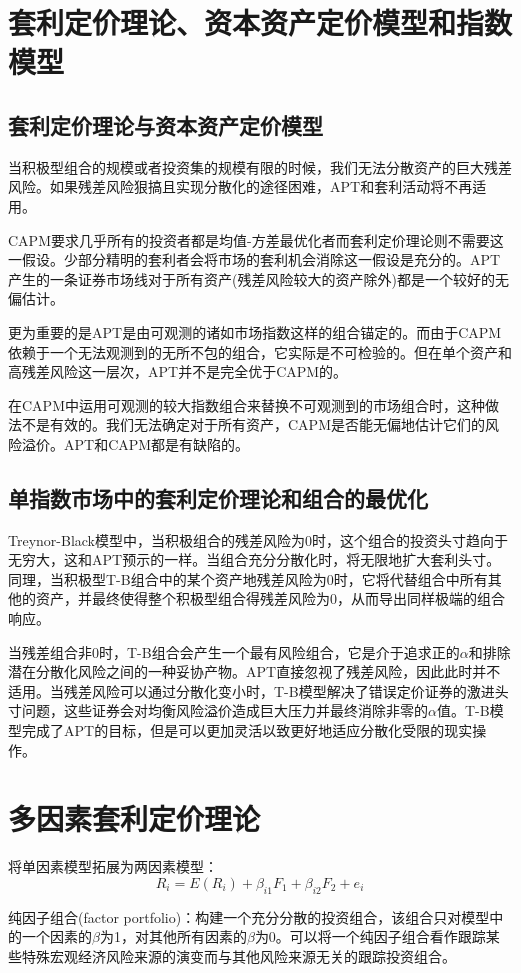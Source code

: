 \documentclass{article}
\begin{document}
\section{套利定价理论、资本资产定价模型和指数模型}
\subsection{套利定价理论与资本资产定价模型}
当积极型组合的规模或者投资集的规模有限的时候，我们无法分散资产的巨大残差风险。如果残差风险狠搞且实现分散化的途径困难，APT和套利活动将不再适用。

CAPM要求几乎所有的投资者都是均值-方差最优化者而套利定价理论则不需要这一假设。少部分精明的套利者会将市场的套利机会消除这一假设是充分的。APT产生的一条证券市场线对于所有资产(残差风险较大的资产除外)都是一个较好的无偏估计。

更为重要的是APT是由可观测的诸如市场指数这样的组合锚定的。而由于CAPM依赖于一个无法观测到的无所不包的组合，它实际是不可检验的。但在单个资产和高残差风险这一层次，APT并不是完全优于CAPM的。

在CAPM中运用可观测的较大指数组合来替换不可观测到的市场组合时，这种做法不是有效的。我们无法确定对于所有资产，CAPM是否能无偏地估计它们的风险溢价。APT和CAPM都是有缺陷的。

\subsection{单指数市场中的套利定价理论和组合的最优化}
Treynor-Black模型中，当积极组合的残差风险为0时，这个组合的投资头寸趋向于无穷大，这和APT预示的一样。当组合充分分散化时，将无限地扩大套利头寸。同理，当积极型T-B组合中的某个资产地残差风险为0时，它将代替组合中所有其他的资产，并最终使得整个积极型组合得残差风险为0，从而导出同样极端的组合响应。

当残差组合非0时，T-B组合会产生一个最有风险组合，它是介于追求正的$\alpha$和排除潜在分散化风险之间的一种妥协产物。APT直接忽视了残差风险，因此此时并不适用。当残差风险可以通过分散化变小时，T-B模型解决了错误定价证券的激进头寸问题，这些证券会对均衡风险溢价造成巨大压力并最终消除非零的$\alpha$值。T-B模型完成了APT的目标，但是可以更加灵活以致更好地适应分散化受限的现实操作。

\section{多因素套利定价理论}
将单因素模型拓展为两因素模型：
\[
R_i=E(R_i)+\beta_{i1}F_1+\beta_{i2}F_2+e_i
\]

纯因子组合(factor portfolio)：构建一个充分分散的投资组合，该组合只对模型中的一个因素的$\beta$为1，对其他所有因素的$\beta$为0。可以将一个纯因子组合看作跟踪某些特殊宏观经济风险来源的演变而与其他风险来源无关的跟踪投资组合。
\end{document}
